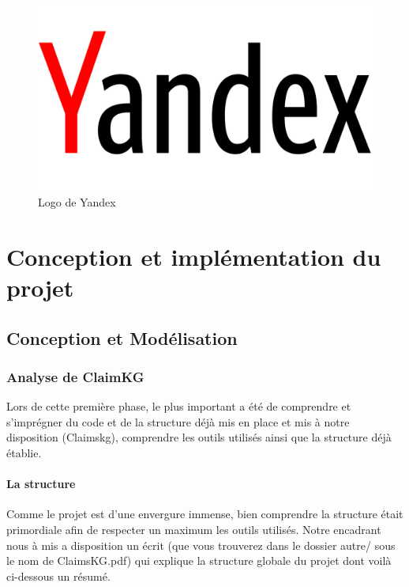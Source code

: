 \documentclass[oneside,13pt,a4paper]{report}
\begin{document}
\begin{figure}[h]
\begin{minipage}[c]{.30\linewidth}
	\end{minipage}
	\hfill%
	\begin{minipage}[c]{.30\linewidth}
		\centering
		\includegraphics[width=1\textwidth]{img/yandex.png}
		\caption{Logo de Yandex}
	\end{minipage}
\end{figure}

\chapter{Conception et implémentation du projet}

\section{Conception et Modélisation}

\subsection{Analyse de ClaimKG}

Lors de cette première phase, le plus important a été de comprendre et s'imprégner du code et de la structure déjà mis en place et mis à notre disposition (Claimskg), comprendre les outils utilisés ainsi que la structure déjà établie.

\subsubsection*{La structure}

Comme le projet est d'une envergure immense, bien comprendre la structure était primordiale afin de respecter un maximum les outils utilisés. Notre encadrant nous à mis a disposition un écrit (que vous trouverez dans le dossier autre/ sous le nom de ClaimsKG.pdf) qui explique la structure globale du projet dont voilà ci-dessous un résumé.
\end{document}
